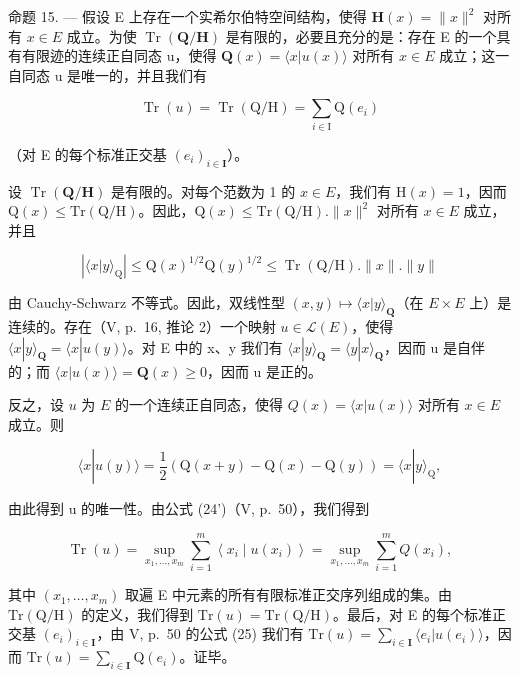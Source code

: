命题 15. --- 假设 E 上存在一个实希尔伯特空间结构，使得 \(\mathbf{H}(x) = \|x\|^2\) 对所有 \(x \in E\) 成立。为使 \(\operatorname{Tr}(\mathbf{Q}/\mathbf{H})\) 是有限的，必要且充分的是：存在 E 的一个具有有限迹的连续正自同态 u，使得 \(\mathbf{Q}(x) = \langle x|u(x) \rangle\) 对所有 \(x \in E\) 成立；这一自同态 u 是唯一的，并且我们有

\[
\operatorname{Tr} (u) = \operatorname{Tr} (\mathrm{Q} / \mathrm{H}) = \sum_ {i \in \mathrm{I}} \mathrm{Q} \left(e _ {i}\right)\tag{44}
\]

（对 E 的每个标准正交基 \((e_i)_{i\in \mathbf{I}}\)）。

设 \(\operatorname{Tr}(\mathbf{Q} / \mathbf{H})\) 是有限的。对每个范数为 1 的 \(x\in E\)，我们有 \(\mathrm{H}(x) = 1\)，因而 \(\mathrm{Q}(x)\leqslant \mathrm{Tr}(\mathrm{Q} / \mathrm{H})\)。因此，\(\mathrm{Q}(x)\leqslant \mathrm{Tr}(\mathrm{Q} / \mathrm{H}).\| x\|^2\) 对所有 \(x\in E\) 成立，并且

\[
\left| \langle x | y \rangle_ {\mathrm{Q}} \right| \leqslant \mathrm{Q} (x) ^ {1 / 2} \mathrm{Q} (y) ^ {1 / 2} \leqslant \operatorname{Tr} (\mathrm{Q} / \mathrm{H}). \| x \|. \| y \|
\]

由 Cauchy-Schwarz 不等式。因此，双线性型 \((x,y)\mapsto\langle x|y\rangle_{\mathbf{Q}}\)（在 \(E\times E\) 上）是连续的。存在（V, p.~16, 推论 2）一个映射 \(u\in\mathcal{L}(E)\)，使得 \(\langle x|y\rangle_{\mathbf{Q}}=\langle x|u(y)\rangle\)。对 E 中的 x、y 我们有 \(\langle x|y\rangle_{\mathbf{Q}}=\langle y|x\rangle_{\mathbf{Q}}\)，因而 u 是自伴的；而 \(\langle x|u(x)\rangle=\mathbf{Q}(x)\geqslant0\)，因而 u 是正的。

反之，设 \(u\) 为 \(E\) 的一个连续正自同态，使得 \(Q(x) = \langle x|u(x) \rangle\) 对所有 \(x \in E\) 成立。则

\[
\langle x | u (y) \rangle = \frac {1}{2} (\mathrm{Q} (x + y) - \mathrm{Q} (x) - \mathrm{Q} (y)) = \langle x | y \rangle_ {\mathrm{Q}},
\]

由此得到 u 的唯一性。由公式 (24')（V, p.~50），我们得到

\[
\operatorname{Tr} (u) = \sup _ {x _ {1}, \dots , x _ {m}} \sum_ {i = 1} ^ {m} \left\langle x _ {i} \mid u \left(x _ {i}\right) \right\rangle = \sup _ {x _ {1}, \dots , x _ {m}} \sum_ {i = 1} ^ {m} Q \left(x _ {i}\right),
\]

其中 \((x_{1},\ldots ,x_{m})\) 取遍 E 中元素的所有有限标准正交序列组成的集。由 \(\mathrm{Tr}(\mathrm{Q / H})\) 的定义，我们得到 \(\mathrm{Tr}(u) = \mathrm{Tr}(\mathrm{Q / H})\)。最后，对 E 的每个标准正交基 \((e_i)_{i\in \mathbf{I}}\)，由 V, p.~50 的公式 (25) 我们有 \(\mathrm{Tr}(u) = \sum_{i\in \mathbf{I}}\langle e_i|u(e_i)\rangle\)，因而 \(\mathrm{Tr}(u) = \sum_{i\in \mathbf{I}}\mathrm{Q}(e_i)\)。证毕。

